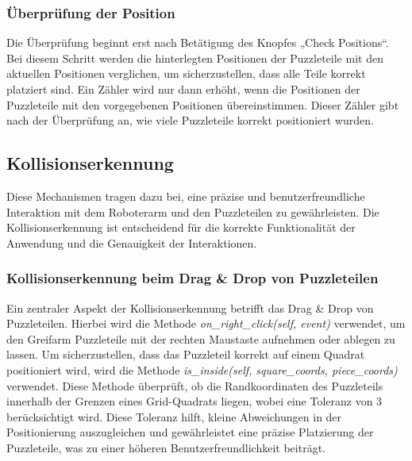 \documentclass[12pt]{article}
\begin{document}
    
    

    \subsubsection{Überprüfung der Position}
    Die Überprüfung beginnt erst nach Betätigung des Knopfes „Check Positions“. Bei diesem Schritt
    werden die hinterlegten Positionen der Puzzleteile mit den aktuellen Positionen verglichen, um
    sicherzustellen, dass alle Teile korrekt platziert sind. Ein Zähler wird nur dann erhöht, wenn die
    Positionen der Puzzleteile mit den vorgegebenen Positionen übereinstimmen. Dieser Zähler gibt nach
    der Überprüfung an, wie viele Puzzleteile korrekt positioniert wurden.

    

    \subsection{Kollisionserkennung}
    Diese Mechanismen tragen dazu bei, eine präzise und benutzerfreundliche Interaktion mit dem
    Roboterarm und den Puzzleteilen zu gewährleisten. Die Kollisionserkennung ist entscheidend für
    die korrekte Funktionalität der Anwendung und die Genauigkeit der Interaktionen.

    \subsubsection{Kollisionserkennung beim Drag \& Drop von Puzzleteilen}
    Ein zentraler Aspekt der Kollisionserkennung betrifft das Drag & Drop von Puzzleteilen. Hierbei wird
    die Methode \textit{on\_right\_click(self, event)} verwendet, um den Greifarm Puzzleteile mit der rechten
    Maustaste aufnehmen oder ablegen zu lassen. Um sicherzustellen, dass das Puzzleteil korrekt auf
    einem Quadrat positioniert wird, wird die Methode \textit{is\_inside(self, square\_coords, piece\_coords)}
    verwendet. Diese Methode überprüft, ob die Randkoordinaten des Puzzleteils innerhalb der Grenzen
    eines Grid-Quadrats liegen, wobei eine Toleranz von 3 berücksichtigt wird. Diese Toleranz hilft,
    kleine Abweichungen in der Positionierung auszugleichen und gewährleistet eine präzise Platzierung
    der Puzzleteile, was zu einer höheren Benutzerfreundlichkeit beiträgt.
\end{document}
